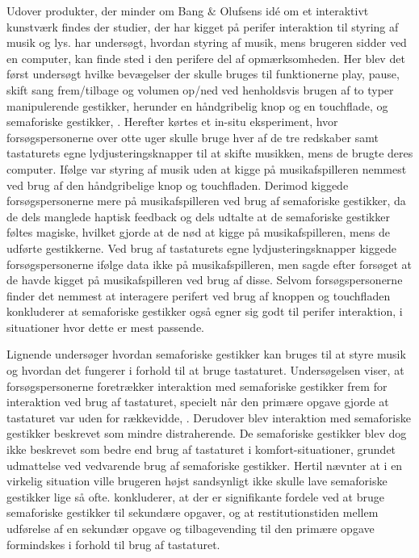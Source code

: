 Udover produkter, der minder om Bang $\&$ Olufsens idé om et interaktivt kunstværk findes der studier, der har kigget på perifer interaktion til styring af musik og lys. \textcite[s. 162]{PDF:ComparingInputModalities} har undersøgt, hvordan styring af musik, mens brugeren sidder ved en computer, kan finde sted i den perifere del af opmærksomheden. Her blev det først undersøgt hvilke bevægelser der skulle bruges til funktionerne play, pause, skift sang frem/tilbage og volumen op/ned ved henholdsvis brugen af to typer manipulerende gestikker, herunder en håndgribelig knop og en touchflade, og semaforiske gestikker, \parencite[ss. 165-166]{PDF:ComparingInputModalities}. Herefter kørtes et in-situ eksperiment, hvor forsøgspersonerne over otte uger skulle bruge hver af de tre redskaber samt tastaturets egne lydjusteringsknapper til at skifte musikken, mens de brugte deres computer. Ifølge \textcite[ss. 172-173]{PDF:ComparingInputModalities} var styring af musik uden at kigge på musikafspilleren nemmest ved brug af den håndgribelige knop og touchfladen. Derimod kiggede forsøgspersonerne mere på musikafspilleren ved brug af semaforiske gestikker, da de dels manglede haptisk feedback og dels udtalte at de semaforiske gestikker føltes magiske, hvilket gjorde at de nød at kigge på musikafspilleren, mens de udførte gestikkerne. Ved brug af tastaturets egne lydjusteringsknapper kiggede forsøgspersonerne ifølge data ikke på musikafspilleren, men sagde efter forsøget at de havde kigget på musikafspilleren ved brug af disse. Selvom forsøgspersonerne finder det nemmest at interagere perifert ved brug af knoppen og touchfladen konkluderer \textcite[s. 177]{PDF:ComparingInputModalities} at semaforiske gestikker også egner sig godt til perifer interaktion, i situationer hvor dette er mest passende.

Lignende \textcite{PDF:ComparingInputModalities} undersøger \textcite{PDF:AStudyOnTheUseOfSemaphoricGestures} hvordan semaforiske gestikker kan bruges til at styre musik og hvordan det fungerer i forhold til at bruge tastaturet. Undersøgelsen viser, at forsøgspersonerne foretrækker interaktion med semaforiske gestikker frem for interaktion ved brug af tastaturet, specielt når den primære opgave gjorde at tastaturet var uden for rækkevidde, \parencite[s. 1963]{PDF:AStudyOnTheUseOfSemaphoricGestures}. Derudover blev interaktion med semaforiske gestikker beskrevet som mindre distraherende. De semaforiske gestikker blev dog ikke beskrevet som bedre end brug af tastaturet i komfort-situationer, grundet udmattelse ved vedvarende brug af semaforiske gestikker. Hertil nævnter \textcite[s. 1963]{PDF:AStudyOnTheUseOfSemaphoricGestures} at i en virkelig situation ville brugeren højst sandsynligt ikke skulle lave semaforiske gestikker lige så ofte. \textcite[s. 1964]{PDF:AStudyOnTheUseOfSemaphoricGestures} konkluderer, at der er signifikante fordele ved at bruge semaforiske gestikker til sekundære opgaver, og at restitutionstiden mellem udførelse af en sekundær opgave og tilbagevending til den primære opgave formindskes i forhold til brug af tastaturet.

